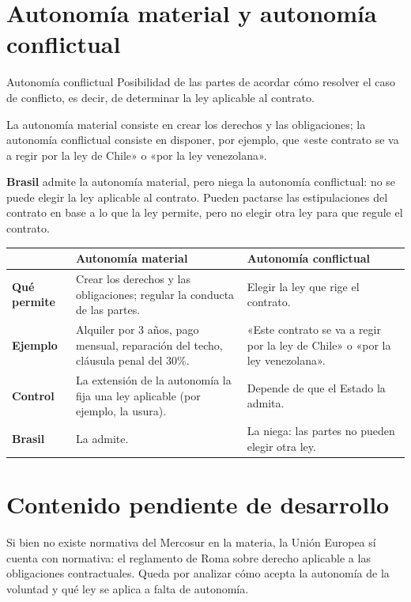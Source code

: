 \documentclass[12pt,oneside]{book}
\begin{document}
\section{Autonomía material y autonomía conflictual}

\begin{definition}{Autonomía conflictual}
Posibilidad de las partes de acordar cómo resolver el caso de conflicto, es decir, de determinar la ley aplicable al contrato.
\end{definition}

La autonomía material consiste en crear los derechos y las obligaciones; la autonomía conflictual consiste en disponer, por ejemplo, que «este contrato se va a regir por la ley de Chile» o «por la ley venezolana».

\textbf{Brasil} admite la autonomía material, pero niega la autonomía conflictual: no se puede elegir la ley aplicable al contrato. Pueden pactarse las estipulaciones del contrato en base a lo que la ley permite, pero no elegir otra ley para que regule el contrato.

\begin{table}[H]
\centering
\small
\begin{tabular}{@{}L{0.16\textwidth}L{0.39\textwidth}L{0.37\textwidth}@{}}
\toprule
 & \textbf{Autonomía material} & \textbf{Autonomía conflictual} \\
\midrule
\textbf{Qué permite} & Crear los derechos y las obligaciones; regular la conducta de las partes. & Elegir la ley que rige el contrato. \\
\addlinespace
\textbf{Ejemplo} & Alquiler por 3 años, pago mensual, reparación del techo, cláusula penal del 30\%. & «Este contrato se va a regir por la ley de Chile» o «por la ley venezolana». \\
\addlinespace
\textbf{Control} & La extensión de la autonomía la fija una ley aplicable (por ejemplo, la usura). & Depende de que el Estado la admita. \\
\addlinespace
\textbf{Brasil} & La admite. & La niega: las partes no pueden elegir otra ley. \\
\bottomrule
\end{tabular}
\end{table}

\section{Contenido pendiente de desarrollo}

Si bien no existe normativa del Mercosur en la materia, la Unión Europea sí cuenta con normativa: el reglamento de Roma sobre derecho aplicable a las obligaciones contractuales. Queda por analizar cómo acepta la autonomía de la voluntad y qué ley se aplica a falta de autonomía.
\end{document}
